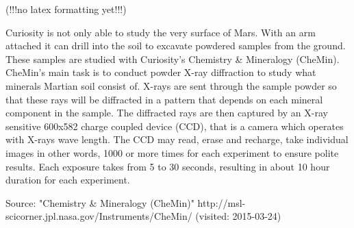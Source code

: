 (!!!no latex formatting yet!!!)

Curiosity is not only able to study the very surface of Mars.
 With an arm attached it can drill into the soil to excavate powdered samples from the ground.
 These samples are studied with Curiosity's Chemistry & Mineralogy (CheMin).
 CheMin's main task is to conduct powder X-ray diffraction to study what minerals Martian soil consist of.
 X-rays are sent through the sample powder so that these rays will be diffracted in a pattern that depends on each mineral component in the sample.
 The diffracted rays are then captured by an X-ray sensitive 600x582 charge coupled device (CCD), that is a camera which operates with X-rays wave length.
 The CCD may read, erase and recharge, take individual images in other words, 1000 or more times for each experiment to ensure polite results.
 Each exposure takes from 5 to 30 seconds, resulting in about 10 hour duration for each experiment.

Source:
"Chemistry & Mineralogy (CheMin)"
http://msl-scicorner.jpl.nasa.gov/Instruments/CheMin/ (visited: 2015-03-24)
